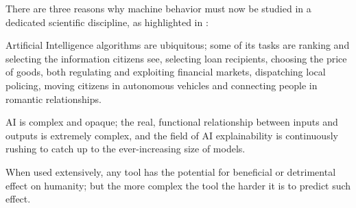 \documentclass[letterpaper,11pt,twocolumn]{article}
\begin{document}
There are three reasons why machine behavior must now be studied in a dedicated scientific discipline, as highlighted in \cite{rahwanMachineBehaviour2019}:
\begin{inlinelist}
    \item Artificial Intelligence algorithms are ubiquitous; some of its tasks are ranking and selecting the information citizens see, selecting loan recipients, choosing the price of goods, both regulating and exploiting financial markets, dispatching local policing, moving citizens in autonomous vehicles and connecting people in romantic relationships.
    \item AI is complex and opaque; the real, functional relationship between inputs and outputs is extremely complex, and the field of AI explainability is continuously rushing to catch up to the ever-increasing size of models.
    \item When used extensively, any tool has the potential for beneficial or detrimental effect on humanity; but the more complex the tool the harder it is to predict such effect.
\end{inlinelist}
\end{document}
